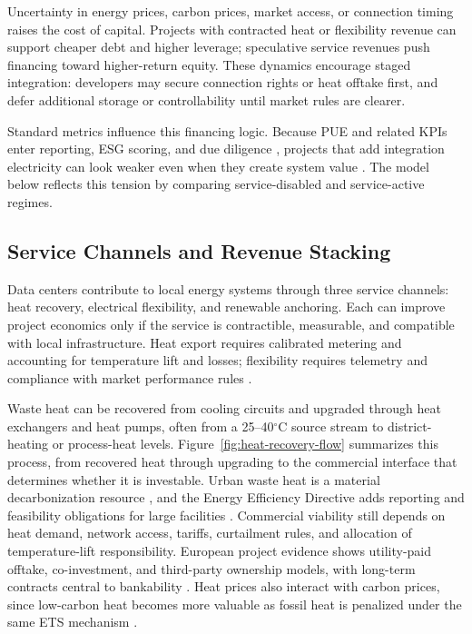 \documentclass[preprint,12pt]{elsarticle}
\begin{document}
Uncertainty in energy prices, carbon prices, market access, or connection timing raises the cost of capital. Projects with contracted heat or flexibility revenue can support cheaper debt and higher leverage; speculative service revenues push financing toward higher-return equity. These dynamics encourage staged integration: developers may secure connection rights or heat offtake first, and defer additional storage or controllability until market rules are clearer.

Standard metrics influence this financing logic. Because PUE and related KPIs enter reporting, ESG scoring, and due diligence \cite{15,16}, projects that add integration electricity can look weaker even when they create system value \cite{Belady2008PUE,VandeVoort2017}. The model below reflects this tension by comparing service-disabled and service-active regimes.

\subsection{Service Channels and Revenue Stacking}

Data centers contribute to local energy systems through three service channels: heat recovery, electrical flexibility, and renewable anchoring. Each can improve project economics only if the service is contractible, measurable, and compatible with local infrastructure. Heat export requires calibrated metering and accounting for temperature lift and losses; flexibility requires telemetry and compliance with market performance rules \cite{8,13}.

Waste heat can be recovered from cooling circuits and upgraded through heat exchangers and heat pumps, often from a 25--40$^\circ$C source stream to district-heating or process-heat levels. Figure~\ref{fig:heat-recovery-flow} summarizes this process, from recovered heat through upgrading to the commercial interface that determines whether it is investable. Urban waste heat is a material decarbonization resource \cite{22}, and the Energy Efficiency Directive adds reporting and feasibility obligations for large facilities \cite{15}. Commercial viability still depends on heat demand, network access, tariffs, curtailment rules, and allocation of temperature-lift responsibility. European project evidence shows utility-paid offtake, co-investment, and third-party ownership models, with long-term contracts central to bankability \cite{11,23}. Heat prices also interact with carbon prices, since low-carbon heat becomes more valuable as fossil heat is penalized under the same ETS mechanism \cite{7}.
\end{document}
